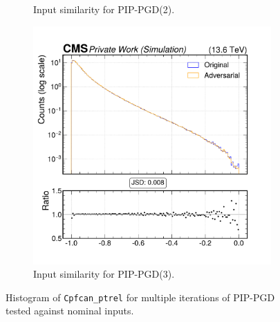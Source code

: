 \begin{figure}[htbp]
\begin{subfigure}[t]{0.32\textwidth}
    \caption*{Input similarity for PIP-PGD(2).}
  \end{subfigure}\hfill
  \begin{subfigure}[t]{0.32\textwidth}
    \includegraphics[width=\linewidth]{media/output/features/compare/combined_it_3/cmp_cpf_arr_Cpfcan_ptrel.pdf}
    \caption*{Input similarity for PIP-PGD(3).}
  \end{subfigure}

  \caption*{Histogram of \texttt{Cpfcan\_ptrel} for multiple iterations of PIP-PGD tested against nominal inputs.}
  \label{fig:combined_input_Cpfcan_ptrel}
\end{figure}

